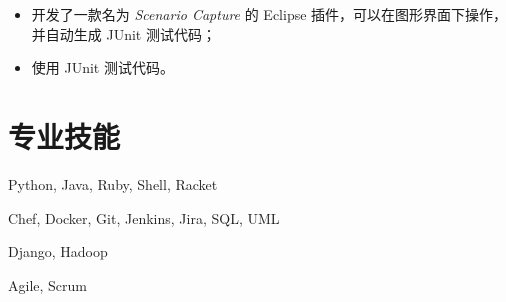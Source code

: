 \documentclass{resume}
\begin{document}
\begin{itemize}
\item 开发了一款名为 \textit{Scenario Capture} 的 Eclipse 插件，可以在图形界面下操作，并自动生成 JUnit 测试代码；
\item 使用 JUnit 测试代码。
\end{itemize}


\section{专业技能}
\begin{description}[style=nextline,leftmargin=3em,topsep=1pt,parsep=0.5ex]
	\item[语言] Python, Java, Ruby, Shell, Racket
	\item[工具] Chef, Docker, Git, Jenkins, Jira, SQL, UML
	\item[框架] Django, Hadoop
	\item[方法] Agile, Scrum
\end{description}
%
%


%
%




\end{document}
